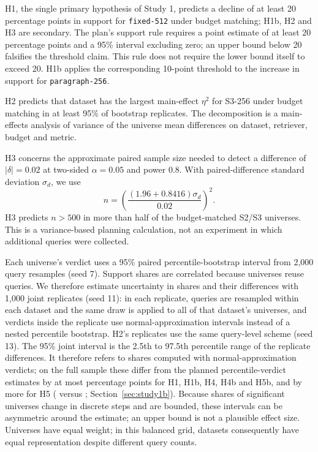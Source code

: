 \documentclass[11pt]{article}
\newcommand{\chunk}[1]{\texttt{#1}}
\begin{document}
H1, the single primary hypothesis of Study 1, predicts a decline of at least 20 percentage points in support for \chunk{fixed-512} under budget matching; H1b, H2 and H3 are secondary. The plan's support rule requires a point estimate of at least 20 percentage points and a 95\% interval excluding zero; an upper bound below 20 falsifies the threshold claim. This rule does not require the lower bound itself to exceed 20. H1b applies the corresponding 10-point threshold to the increase in support for \chunk{paragraph-256}.

H2 predicts that dataset has the largest main-effect $\eta^2$ for S3-256 under budget matching in at least 95\% of bootstrap replicates. The decomposition is a main-effects analysis of variance of the universe mean differences on dataset, retriever, budget and metric.

H3 concerns the approximate paired sample size needed to detect a difference of $|\delta|=0.02$ at two-sided $\alpha=0.05$ and power 0.8. With paired-difference standard deviation $\sigma_d$, we use
\begin{equation}
n=\left(\frac{(1.96+0.8416)\sigma_d}{0.02}\right)^2.
\label{eq:power}
\end{equation}
H3 predicts $n>500$ in more than half of the budget-matched S2/S3 universes. This is a variance-based planning calculation, not an experiment in which additional queries were collected.

Each universe's verdict uses a 95\% paired percentile-bootstrap interval from 2,000 query resamples (seed 7). Support shares are correlated because universes reuse queries. We therefore estimate uncertainty in shares and their differences with 1,000 joint replicates (seed 11): in each replicate, queries are resampled within each dataset and the same draw is applied to all of that dataset's universes, and verdicts inside the replicate use normal-approximation intervals instead of a nested percentile bootstrap. H2's replicates use the same query-level scheme (seed 13). The 95\% joint interval is the 2.5th to 97.5th percentile range of the replicate differences. It therefore refers to shares computed with normal-approximation verdicts; on the full sample these differ from the planned percentile-verdict estimates by at most \NormalGapMaxOther{} percentage points for H1, H1b, H4, H4b and H5b, and by more for H5 (\HFiveNormalEst{} versus \HFiveEst{}; Section~\ref{sec:study1b}). Because shares of significant universes change in discrete steps and are bounded, these intervals can be asymmetric around the estimate; an upper bound is not a plausible effect size. Universes have equal weight; in this balanced grid, datasets consequently have equal representation despite different query counts.
\end{document}

